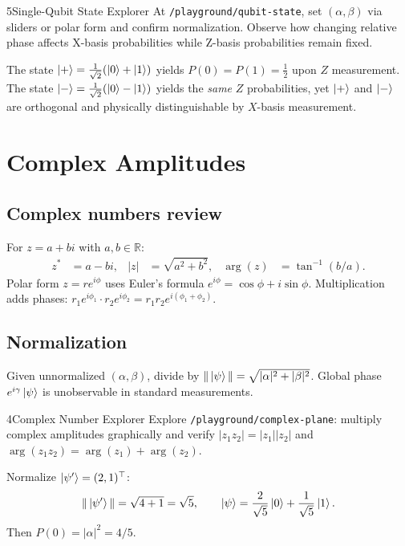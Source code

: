 \begin{labbox}{5}{Single-Qubit State Explorer}
At \texttt{/playground/qubit-state}, set $(\alpha,\beta)$ via sliders or polar form and confirm normalization. Observe how changing relative phase affects X-basis probabilities while Z-basis probabilities remain fixed.
\end{labbox}

\begin{example}
The state $\ket{+}=\frac{1}{\sqrt{2}}(\ket{0}+\ket{1})$ yields $P(0)=P(1)=\frac{1}{2}$ upon $Z$ measurement. The state $\ket{-}=\frac{1}{\sqrt{2}}(\ket{0}-\ket{1})$ yields the \emph{same} $Z$ probabilities, yet $\ket{+}$ and $\ket{-}$ are orthogonal and physically distinguishable by $X$-basis measurement.
\end{example}

\section{Complex Amplitudes}
\label{sec:complex-amplitudes}

\subsection{Complex numbers review}

For $z=a+bi$ with $a,b\in\mathbb{R}$:
\begin{align}
z^* &= a-bi, & |z| &= \sqrt{a^2+b^2}, & \arg(z) &= \tan^{-1}(b/a).
\end{align}
Polar form $z = re^{i\phi}$ uses Euler's formula $e^{i\phi}=\cos\phi + i\sin\phi$. Multiplication adds phases: $r_1 e^{i\phi_1}\cdot r_2 e^{i\phi_2} = r_1 r_2 e^{i(\phi_1+\phi_2)}$.

\subsection{Normalization}

Given unnormalized $(\alpha,\beta)$, divide by $\|\ket{\psi}\|=\sqrt{|\alpha|^2+|\beta|^2}$. Global phase $e^{i\gamma}\ket{\psi}$ is unobservable in standard measurements.

\begin{labbox}{4}{Complex Number Explorer}
Explore \texttt{/playground/complex-plane}: multiply complex amplitudes graphically and verify $|z_1 z_2|=|z_1||z_2|$ and $\arg(z_1 z_2)=\arg(z_1)+\arg(z_2)$.
\end{labbox}

\begin{example}
Normalize $\ket{\psi'}=(2,1)^\top$:
\[
\|\ket{\psi'}\| = \sqrt{4+1}=\sqrt{5},\qquad
\ket{\psi}=\frac{2}{\sqrt{5}}\ket{0}+\frac{1}{\sqrt{5}}\ket{1}.
\]
Then $P(0)=|\alpha|^2=4/5$.
\end{example}

